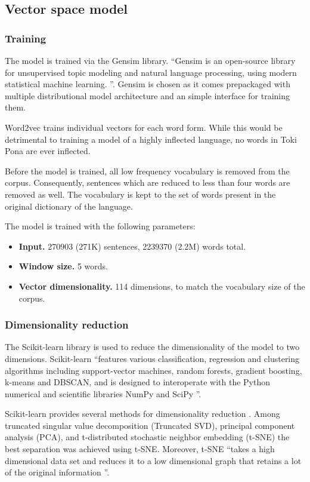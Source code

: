 \documentclass[14pt, a4paper]{extreport}
\begin{document}
    \subsection{Vector space model}
      \subsubsection{Training}
The model is trained via the Gensim library. ``Gensim is an open-source library for unsupervised topic modeling and natural language processing, using modern statistical machine learning. \parencite{gensim}''. Gensim is chosen as it comes prepackaged with multiple distributional model architecture and an simple interface for training them.

Word2vec trains individual vectors for each word form. While this would be detrimental to training a model of a highly inflected language, no words in Toki Pona are ever inflected.

Before the model is trained, all low frequency vocabulary is removed from the corpus. Consequently, sentences which are reduced to less than four words are removed as well. The vocabulary is kept to the set of words present in the original dictionary of the language.

The model is trained with the following parameters:

\begin{itemize}
  \item \textbf{Input.} 270903 (271K) sentences, 2239370 (2.2M) words total.
  \item \textbf{Window size.} 5 words.
  \item \textbf{Vector dimensionality.} 114 dimensions, to match the vocabulary size of the corpus.
\end{itemize}
      \subsubsection{Dimensionality reduction}
The Scikit-learn library is used to reduce the dimensionality of the model to two dimensions. Scikit-learn ``features various classification, regression and clustering algorithms including support-vector machines, random forests, gradient boosting, k-means and DBSCAN, and is designed to interoperate with the Python numerical and scientific libraries NumPy and SciPy \parencite{scikit}''.

Scikit-learn provides several methods for dimensionality reduction \parencite{tsne}. Among truncated singular value decomposition (Truncated SVD), principal component analysis (PCA), and t-distributed stochastic neighbor embedding (t-SNE) the best separation was achieved using t-SNE. Moreover, t-SNE ``takes a high dimensional data set and reduces it to a low dimensional graph that retains a lot of the original information \parencite{dimred}''.
\end{document}
